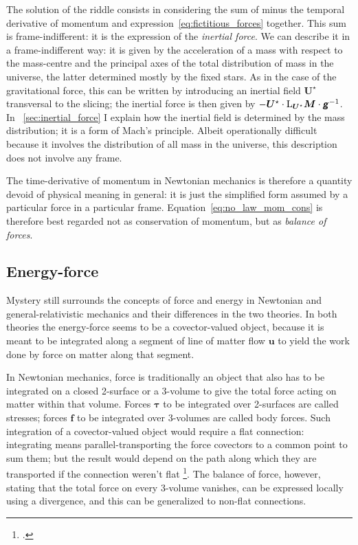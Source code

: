 \documentclass[\ifafour a4paper,12pt,\else a5paper,10pt,\fi%
onecolumn,oneside,article,%
british%
]{memoir}
\theoremstyle{remark}
\theoremstyle{innote}
\newcommand*{\mathte}[1]{\textbf{\textit{\textsf{#1}}}}
\newcommand*{\citep}{\footcites}
\renewcommand*{\|}[1][]{\nonscript\,#1\vert\nonscript\;\mathopen{}}
\newcommand*{\sect}{\S}%
\newcommand*{\puzzle}{{\fontencoding{U}\fontfamily{fontawesometwo}\selectfont\symbol{225}}}
\newcommand*{\psect}{{\footnotesize\puzzle}}%
\newcommand*{\Li}{\mathrm{L}}
\newcommand*{\yrr}{M}
\newcommand*{\yr}{\bm{\yrr}}
\newcommand*{\ycc}{u}
\newcommand*{\yc}{\bm{\ycc}}
\newcommand*{\yTT}{\tau}
\newcommand*{\yT}{\bm{\yTT}}
\newcommand*{\ybb}{f}
\newcommand*{\yb}{\bm{\ybb}}
\newcommand*{\yFF}{U}
\newcommand*{\yF}{\bm{\yFF}}
\newcommand*{\yFi}{\yF^{\mathord{\star}}}
\newcommand*{\ygg}{g}
\newcommand*{\yg}{\mathte{\ygg}}
\begin{document}
The solution of the riddle consists in considering the sum of minus the
temporal derivative of momentum and expression~\eqref{eq:fictitious_forces}
together. This sum is frame-indifferent: it is the expression of the
\emph{inertial force}. We can describe it in a frame-indifferent way: it is
given by the acceleration of a mass with respect to the mass-centre and the
principal axes of the total distribution of mass in the universe, the
latter determined mostly by the fixed stars. As in the case of the
gravitational force, this can be written by introducing an inertial field
$\yFi$ transversal to the slicing; the inertial force is then given by
$-\yFi \cdot \Li_{\yFi}\yr \cdot \yg^{-1}$. In
\psect~\ref{sec:inertial_force} I explain how the inertial field is
determined by the mass distribution; it is a form of Mach's principle.
Albeit operationally difficult because it involves the distribution of all
mass in the universe, this description does not involve any frame.

The time-derivative of momentum in Newtonian mechanics is therefore a
quantity devoid of physical meaning in general: it is just the simplified
form assumed by a particular force in a particular frame.
Equation~\eqref{eq:no_law_mom_cons} is therefore best regarded not as
conservation of momentum, but as \emph{balance of forces}.
\fi

\subsection{Energy-force}
\label{sec:force_balance_newton}

Mystery still surrounds the concepts of force and energy in Newtonian and
general-relativistic mechanics and their differences in the two theories.
In both theories the energy-force seems to be a covector-valued object,
because it is meant to be integrated along a segment of line of matter flow
$\yc$ to yield the work done by force on matter along that segment.

In Newtonian mechanics, force is traditionally an object that also has to
be integrated on a closed 2-surface or a 3-volume to give the total force
acting on matter within that volume. Forces $\yT$ to be integrated over
2-surfaces are called stresses; forces $\yb$ to be integrated over
3-volumes are called body forces. Such integration of a covector-valued
object would require a flat connection: integrating means
parallel-transporting the force covectors to a common point to sum them;
but the result would depend on the path along which they are transported if
the connection weren't flat \citep[\sect~238]{truesdelletal1960}. The
balance of force, however, stating that the total force on every 3-volume
vanishes, can be expressed locally using a divergence, and this can be
generalized to non-flat connections.
\end{document}
